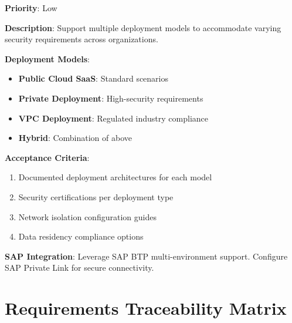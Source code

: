 \begin{tcolorbox}[colback=purple!5,colframe=purple!70,title=BR-5.4: Deployment Flexibility]
\textbf{Priority}: Low

\textbf{Description}: Support multiple deployment models to accommodate varying
security requirements across organizations.

\textbf{Deployment Models}:
\begin{itemize}
  \item \textbf{Public Cloud SaaS}: Standard scenarios
  \item \textbf{Private Deployment}: High-security requirements
  \item \textbf{VPC Deployment}: Regulated industry compliance
  \item \textbf{Hybrid}: Combination of above
\end{itemize}

\textbf{Acceptance Criteria}:
\begin{enumerate}
  \item Documented deployment architectures for each model
  \item Security certifications per deployment type
  \item Network isolation configuration guides
  \item Data residency compliance options
\end{enumerate}

\textbf{SAP Integration}: Leverage SAP BTP multi-environment support. Configure
SAP Private Link for secure connectivity.
\end{tcolorbox}


\section{Requirements Traceability Matrix}


